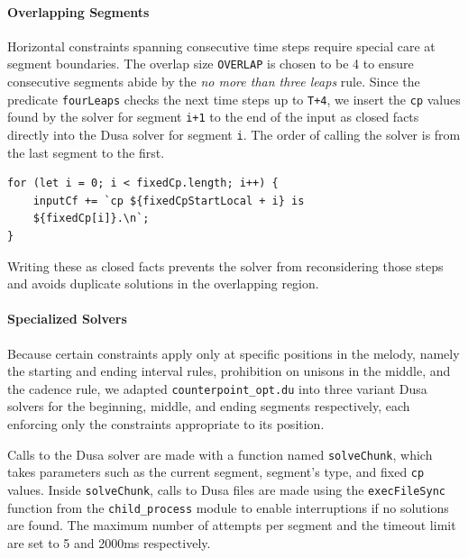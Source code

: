 \paragraph{Overlapping Segments}

Horizontal constraints spanning consecutive time steps require special care at segment boundaries. The overlap size \verb|OVERLAP| is chosen to be 4 to ensure consecutive segments abide by the \emph{no more than three leaps} rule. Since the predicate \verb|fourLeaps| checks the next time steps up to \verb|T+4|, we insert the \verb|cp| values found by the solver for segment \verb|i+1| to the end of the input as closed facts directly into the Dusa solver for segment \verb|i|. The order of calling the solver is from the last segment to the first.
\begin{verbatim}
for (let i = 0; i < fixedCp.length; i++) {
    inputCf += `cp ${fixedCpStartLocal + i} is
    ${fixedCp[i]}.\n`;
}
\end{verbatim}

Writing these as closed facts prevents the solver from reconsidering those steps and avoids duplicate solutions in the overlapping region.

\paragraph{Specialized Solvers}

Because certain constraints apply only at specific positions in the melody, namely the starting and ending interval rules, prohibition on unisons in the middle, and the cadence rule, we adapted \texttt{counterpoint\_opt.du} into three variant Dusa solvers for the beginning, middle, and ending segments respectively, each enforcing only the constraints appropriate to its position.

Calls to the Dusa solver are made with a function named \verb|solveChunk|, which takes parameters such as the current segment, segment's type, and fixed \verb|cp| values. Inside \verb|solveChunk|, calls to Dusa files are made using the \verb|execFileSync| function from the \verb|child_process| module to enable interruptions if no solutions are found. The maximum number of attempts per segment and the timeout limit are set to 5 and 2000ms respectively.

